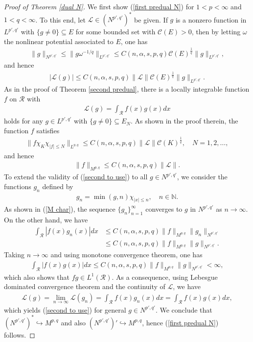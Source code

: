 \documentclass[10pt,reqno]{amsart}
\numberwithin{equation}{section}
\begin{document}
\begin{proof}[Proof of Theorem \ref{dual N}]
We first show (\ref{first predual N}) for $1<p<\infty$ and $1<q<\infty$. To this end, let $\mathcal{L}\in(N^{p',q'})^{\ast}$ be given. If $g$ is a nonzero function in $L^{p',q'}$ with $\{g\ne 0\}\subseteq E$ for some bounded set with $\mathcal{C}(E)>0$, then by letting $\omega$ the nonlinear potential associated to $E$, one has
\begin{align*}
\|g\|_{N^{p',q'}}\leq\|g\omega^{-1/q}\|_{L^{p',q'}}\leq C(n,\alpha,s,p,q)\mathcal{C}(E)^{\frac{1}{q}}\|g\|_{L^{p',q'}},
\end{align*}
and hence 
\begin{align*}
|\mathcal{L}(g)|\leq C(n,\alpha,s,p,q)\|\mathcal{L}\|\mathcal{C}(E)^{\frac{1}{q}}\|g\|_{L^{p',q'}}.
\end{align*}
As in the proof of Theorem \ref{second predual}, there is a locally integrable function $f$ on $\mathcal{R}$ with 
\begin{align}\label{second to use}
\mathcal{L}(g)=\int_{\mathcal{R}}f(x)g(x)dx
\end{align}
holds for any $g\in L^{p',q'}$ with $\{g\ne 0\}\subseteq E_{N}$. As shown in the proof therein, the function $f$ satisfies
\begin{align*}
\|f\chi_{K}\chi_{|f|\leq N}\|_{L^{p,q}}\leq C(n,\alpha,s,p,q)\|\mathcal{L}\|\mathcal{C}(K)^{\frac{1}{q}},\quad N=1,2,\ldots,
\end{align*}
and hence
\begin{align*}
\|f\|_{M^{p,q}}\leq C(n,\alpha,s,p,q)\|\mathcal{L}\|.
\end{align*}
To extend the validity of (\ref{second to use}) to all $g\in N^{p',q'}$, we consider the functions $g_{n}$ defined by
\begin{align*}
g_{n}=\min(g,n)\chi_{|x|\leq n},\quad n\in\mathbb{N}.
\end{align*}
As shown in (\ref{M char}), the sequence $\{g_{n}\}_{n=1}^{\infty}$ converges to $g$ in $N^{p',q'}$ as $n\rightarrow\infty$. On the other hand, we have 
\begin{align*}
\int_{\mathcal{R}}|f(x)g_{n}(x)|dx&\leq C(n,\alpha,s,p,q)\|f\|_{M^{p,q}}\|g_{n}\|_{N^{p',q'}}\\
&\leq C(n,\alpha,s,p,q)\|f\|_{M^{p,q}}\|g\|_{N^{p',q'}}.
\end{align*}
Taking $n\rightarrow\infty$ and using monotone convergence theorem, one has
\begin{align*}
\int_{\mathcal{R}}|f(x)g(x)|dx\leq C(n,\alpha,s,p,q)\|f\|_{M^{p,q}}\|g\|_{N^{p',q'}}<\infty,
\end{align*}
which also shows that $fg\in L^{1}(\mathcal{R})$. As a consequence, using Lebesgue dominated convergence theorem and the continuity of $\mathcal{L}$, we have
\begin{align*}
\mathcal{L}(g)=\lim_{n\rightarrow\infty}\mathcal{L}(g_{n})=\int_{\mathcal{R}}f(x)g_{n}(x)dx=\int_{\mathcal{R}}f(x)g(x)dx,
\end{align*}
which yields (\ref{second to use}) for general $g\in N^{p',q'}$. We conclude that $(N^{p',q'})^{\ast}\hookrightarrow M^{p,q}$ and also $(N^{p',q'})'\hookrightarrow M^{p,q}$, hence (\ref{first predual N}) follows.


\end{proof}
\end{document}
